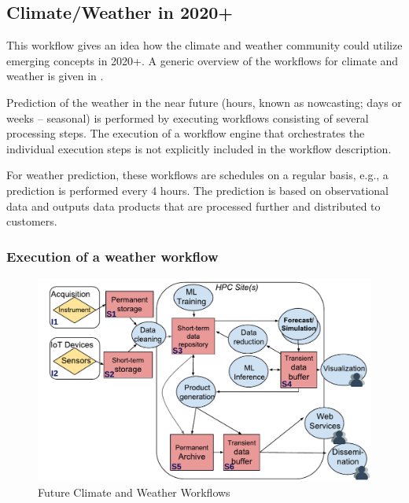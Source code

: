 \documentclass[a4paper, twocolumn]{article}
\begin{document}
\subsection{Climate/Weather in 2020+}

This workflow gives an idea how the climate and weather community could utilize emerging concepts in 2020+.
A generic overview of the workflows for climate and weather is given in .

Prediction of the weather in the near future (hours, known as nowcasting; days or weeks -- seasonal) is performed by executing workflows consisting of several processing steps. The execution of a workflow engine that orchestrates the individual execution steps is not explicitly included in the workflow description.

For weather prediction, these workflows are schedules on a regular basis, e.g., a prediction is performed every 4 hours. The prediction is based on observational data and outputs data products that are processed further and distributed to customers.

\subsubsection{Execution of a weather workflow}



\begin{figure}[b]
  \includegraphics[width=\columnwidth]{climateweather-workflow}
  \caption{Future Climate and Weather Workflows}
  \label{fig:climateWeather}
\end{figure}
\end{document}
